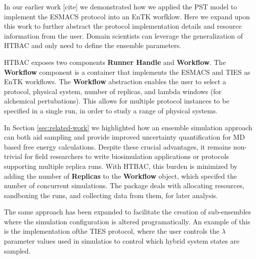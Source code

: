 In our earlier work [cite] we demonstrated how we applied the PST model to
implement the ESMACS protocol into an EnTK worfklow. Here we expand upon this
work to further abstract the protocol implementation details and resource
information from the user. Domain scientists can leverage the generalization
of HTBAC and only need to define the ensemble parameters.

HTBAC exposes two components \textbf{Runner Handle} and \textbf{Workflow}.
 The \textbf{Workflow} component is a
container that implements the ESMACS and TIES as EnTK workflows.  The
\textbf{Workflow} abstraction enables the user to select a protocol, physical
system, number of replicas, and lambda windows (for alchemical pertubations).
This allows for multiple protocol instances to be specified in a single run,
in order to study a range of physical systems. 

In Section \ref{sec:related-work} we highlighted how an ensemble simulation 
approach can both aid sampling and provide improved uncertainty quantification for MD based free energy calculations.
Despite these crucial advantages, it remains non-trivial for field 
researchers to write biosimulation applications or protocols supporting 
multiple replica runs. 
With HTBAC, this burden is minimized by adding the number of \textbf{Replicas} to the
\textbf{Workflow} object, which specifed the number of concurrent simulations.
The package deals with allocating resources, sandboxing the runs, and
collecting data from them, for later analysis. 

The same approach has been expanded to facilitate the creation of 
sub-ensembles where the simulation configuration is altered programatically.
An example of this is the implementation ofthe TIES protocol,
where the user controls the $\lambda$ parameter values used in simulatios to control which hybrid system states are sampled.


